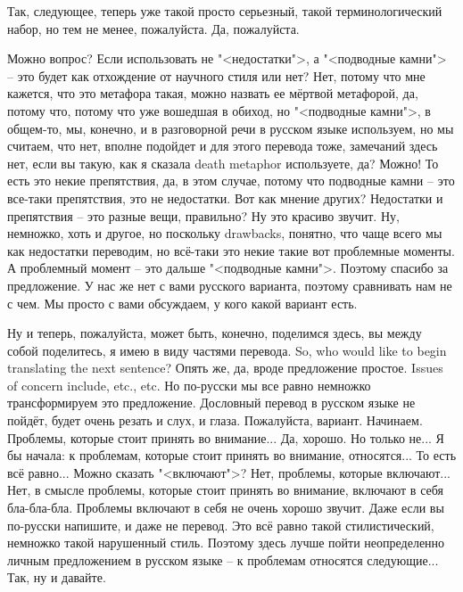 \documentclass[main.tex]{subfiles}
\begin{document}
Так, следующее, теперь уже такой просто серьезный, такой терминологический набор, но тем не менее, пожалуйста.
Да, пожалуйста.

Можно вопрос?
Если использовать не "<недостатки">, а "<подводные камни"> -- это будет как отхождение от научного стиля или нет?
Нет, потому что мне кажется, что это метафора такая, можно назвать ее мёртвой метафорой, да, потому что, потому что уже вошедшая в обиход, но "<подводные камни">, в общем-то, мы, конечно, и в разговорной речи в русском языке используем, но мы считаем, что нет, вполне подойдет и для этого перевода тоже, замечаний здесь нет, если вы такую, как я сказала death metaphor используете, да?
Можно!
То есть это некие препятствия, да, в этом случае, потому что подводные камни -- это все-таки препятствия, это не недостатки.
Вот как мнение других?
Недостатки и препятствия -- это разные вещи, правильно?
Ну это красиво звучит.
Ну, немножко, хоть и другое, но поскольку drawbacks, понятно, что чаще всего мы как недостатки переводим, но всё-таки это некие такие вот проблемные моменты.
А проблемный момент -- это дальше "<подводные камни">.
Поэтому спасибо за предложение.
У нас же нет с вами русского варианта, поэтому сравнивать нам не с чем.
Мы просто с вами обсуждаем, у кого какой вариант есть.

Ну и теперь, пожалуйста, может быть, конечно, поделимся здесь, вы между собой поделитесь, я имею в виду частями перевода.
So, who would like to begin translating the next sentence?
Опять же, да, вроде предложение простое.
Issues of concern include, etc., etc.
Но по-русски мы все равно немножко трансформируем это предложение.
Дословный перевод в русском языке не пойдёт, будет очень резать и слух, и глаза.
Пожалуйста, вариант.
Начинаем.
Проблемы, которые стоит принять во внимание...
Да, хорошо.
Но только не...
Я бы начала: к проблемам, которые стоит принять во внимание, относятся...
То есть всё равно...
Можно сказать "<включают">?
Нет, проблемы, которые включают...
Нет, в смысле проблемы, которые стоит принять во внимание, включают в себя бла-бла-бла.
Проблемы включают в себя не очень хорошо звучит.
Даже если вы по-русски напишите, и даже не перевод.
Это всё равно такой стилистический, немножко такой нарушенный стиль.
Поэтому здесь лучше пойти неопределенно личным предложением в русском языке -- к проблемам относятся следующие...
Так, ну и давайте.
\end{document}
